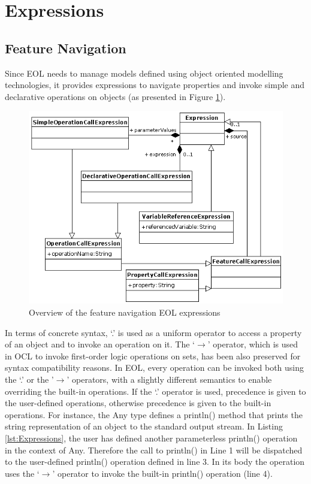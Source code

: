\section{Expressions}

\subsection{Feature Navigation}
\label{sec:Design.EOL.FeatureNavigation}
Since EOL needs to manage models defined using object oriented modelling technologies, it provides expressions to navigate properties and invoke simple and declarative operations on objects (as presented in Figure \ref{fig:EOLExpressions}). 

\begin{figure}
	\centering
		\includegraphics{images/EOLExpressions.png}
	\caption{Overview of the feature navigation EOL expressions}
	\label{fig:EOLExpressions}
\end{figure}



In terms of concrete syntax, `.' is used as a uniform operator to access a property of an object and to invoke an operation on it. The `$\rightarrow$' operator, which is used in OCL to invoke first-order logic operations on sets, has been also preserved for syntax compatibility reasons. In EOL, every operation can be invoked both using the `.' or the '$\rightarrow$' operators, with a slightly different semantics to enable overriding the built-in operations. If the `.' operator is used, precedence is given to the user-defined operations, otherwise precedence is given to the built-in operations. For instance, the Any type defines a println() method that prints the string representation of an object to the standard output stream. In Listing \ref{lst:Expressions}, the user has defined another parameterless println() operation in the context of Any. Therefore the call to println() in Line 1 will be dispatched to the user-defined println() operation defined in line 3. In its body the operation uses the `$\rightarrow$' operator to invoke the built-in println() operation (line 4).

